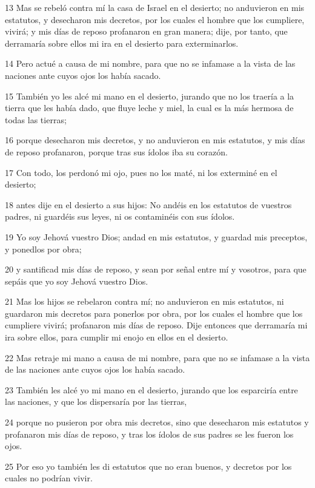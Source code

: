 \par 13 Mas se rebeló contra mí la casa de Israel en el desierto; no anduvieron en mis estatutos, y desecharon mis decretos, por los cuales el hombre que los cumpliere, vivirá; y mis días de reposo profanaron en gran manera; dije, por tanto, que derramaría sobre ellos mi ira en el desierto para exterminarlos.
\par 14 Pero actué a causa de mi nombre, para que no se infamase a la vista de las naciones ante cuyos ojos los había sacado.
\par 15 También yo les alcé mi mano en el desierto, jurando que no los traería a la tierra que les había dado, que fluye leche y miel, la cual es la más hermosa de todas las tierras;
\par 16 porque desecharon mis decretos, y no anduvieron en mis estatutos, y mis días de reposo profanaron, porque tras sus ídolos iba su corazón.
\par 17 Con todo, los perdonó mi ojo, pues no los maté, ni los exterminé en el desierto;
\par 18 antes dije en el desierto a sus hijos: No andéis en los estatutos de vuestros padres, ni guardéis sus leyes, ni os contaminéis con sus ídolos. 
\par 19 Yo soy Jehová vuestro Dios; andad en mis estatutos, y guardad mis preceptos, y ponedlos por obra;
\par 20 y santificad mis días de reposo, y sean por señal entre mí y vosotros, para que sepáis que yo soy Jehová vuestro Dios.
\par 21 Mas los hijos se rebelaron contra mí; no anduvieron en mis estatutos, ni guardaron mis decretos para ponerlos por obra, por los cuales el hombre que los cumpliere vivirá; profanaron mis días de reposo. Dije entonces que derramaría mi ira sobre ellos, para cumplir mi enojo en ellos en el desierto.
\par 22 Mas retraje mi mano a causa de mi nombre, para que no se infamase a la vista de las naciones ante cuyos ojos los había sacado.
\par 23 También les alcé yo mi mano en el desierto, jurando que los esparciría entre las naciones, y que los dispersaría por las tierras, 
\par 24 porque no pusieron por obra mis decretos, sino que desecharon mis estatutos y profanaron mis días de reposo, y tras los ídolos de sus padres se les fueron los ojos.
\par 25 Por eso yo también les di estatutos que no eran buenos, y decretos por los cuales no podrían vivir.
